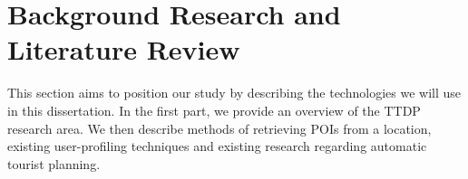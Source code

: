 
\section{Background Research and Literature Review}
\label{Literature}

This section aims to position our study by describing the technologies we will
use in this dissertation. In the first part, we provide an
overview of the TTDP research area. We then describe
methods of retrieving POIs from a location, existing
user-profiling techniques and existing research
regarding automatic tourist planning.


